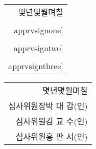 \documentclass[a4paper]{article}
\makeatletter
\newenvironment{myepigraph}
{\par\hfill
	\begin{tabular}{@{}r@{\hspace{20mm}}}%
	}%
	{%
	\end{tabular}\par\medskip}
\def\apprvsignone{parkdaegam.png}	%
\def\apprvsigntwo{ntiea.png}		%
\def\apprvsignthree{hongpanseo.png}	%
\def\apprvsign{(인)}
\newlength{\apprvsignonewidth}
\newlength{\apprvsigntwowidth}
\newlength{\apprvsignthreewidth}
\newlength{\apprvsignwidth}
\makeatother
\begin{document}
	
	\vspace*{3em}
	
	\begin{myepigraph}
		{\Large {몇년몇월며칠}}\\[11mm]
		{\Large 
		심사위원장\hspace{5mm}박 대 감\hspace{6mm}%
		\trimbox{%
			{3.4mm} 6mm %
			{\apprvsignonewidth-\apprvsignwidth-2.67mm} 6mm}
		{%
			\begin{tikzpicture}
			\draw (\apprvsignonewidth/2-\apprvsignwidth,0) 
			node {%
				\texttt{[image: \\apprvsignone]}};
				\draw (0,0) node {\apprvsign};
			\end{tikzpicture}}%
		}\\[8mm]
		{\Large 
		심사위원\hspace{5mm}김 교 수\hspace{6mm}%
		\trimbox{%
			{3.4mm} 6mm %
			{\apprvsigntwowidth-\apprvsignwidth-2.67mm} 6mm}
		{%
			\begin{tikzpicture}
			\draw (\apprvsigntwowidth/2-\apprvsignwidth,0) 
			node 
			{%
				\texttt{[image: \\apprvsigntwo]}};
				\draw (0,0) node {\apprvsign};
			\end{tikzpicture}}%
		}\\[8mm]
		{\Large 
		심사위원\hspace{5mm}홍 판 서\hspace{6mm}%
		\trimbox{%
			{3.4mm} 6mm %
			{\apprvsignthreewidth-\apprvsignwidth-2.67mm} 6mm}
		{%
			\begin{tikzpicture}
			\draw (\apprvsignthreewidth/2-\apprvsignwidth,0) 
			node {%
				\texttt{[image: \\apprvsignthree]}};
				\draw (0,0) node {\apprvsign};
			\end{tikzpicture}}%
		}
	\end{myepigraph}


	\vspace{3em}

	\begin{myepigraph}
	{\Large {몇년몇월며칠}}\\[11mm]
	{\Large 심사위원장\hspace{5mm}박 대 감\hspace{6mm}(인)}\\[8mm]
	{\Large 심사위원\hspace{5mm}김 교 수\hspace{6mm}(인)}\\[8mm]
	{\Large 심사위원\hspace{5mm}홍 판 서\hspace{6mm}(인)}
	\end{myepigraph}
\end{document}
